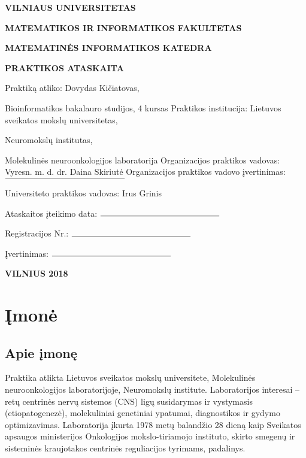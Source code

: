 \documentclass[a4paper,12pt]{article}
\begin{document}
\textwidth 6.5in
\textheight 9.00in
\begin{titlepage}
\vskip 20pt
\centerline{\bf \large VILNIAUS UNIVERSITETAS}
\bigskip
\centerline{\large \textbf{MATEMATIKOS IR INFORMATIKOS FAKULTETAS}}
\bigskip
\centerline{\large \textbf{MATEMATINĖS INFORMATIKOS KATEDRA}}
\vskip 100pt
\centerline{\bf \Large \textbf{PRAKTIKOS ATASKAITA}}
\vskip 100pt
\begin{flushleft}
Praktiką atliko:
\hfill
Dovydas Kičiatovas,

\hfill
Bioinformatikos bakalauro studijos, 4 kursas
\vskip 10pt
Praktikos institucija:
\hfill
Lietuvos sveikatos mokslų universitetas,

\hfill
Neuromokslų institutas,

\hfill
Molekulinės neuroonkologijos laboratorija
\vskip 10pt
Organizacijos praktikos vadovas:
\hfill
Vyresn. m. d. dr. Daina Skiriutė
\vskip 10pt
Organizacijos praktikos vadovo įvertinimas:\hfill$\rule{5cm}{0.15mm}$
\hfill

\vskip 10pt
Universiteto praktikos vadovas:
\hfill
Irus Grinis

\end{flushleft}
\bigskip
\bigskip
\begin{flushright}
Ataskaitos įteikimo data: $\rule{5cm}{0.15mm}$

Registracijos Nr.: $\rule{5cm}{0.15mm}$

Įvertinimas: $\rule{5cm}{0.15mm}$
\end{flushright}
\vskip 100pt
\centerline{\large \textbf{VILNIUS 2018}}
\end{titlepage}
\newpage
\tableofcontents
\newpage
\section{Įmonė}
\indent\indent
\subsection{Apie įmonę}
Praktika atlikta Lietuvos sveikatos mokslų universitete, Molekulinės neuroonkologijos laboratorijoje, Neuromokslų institute. Laboratorijos interesai – retų centrinės nervų sistemos (CNS) ligų susidarymas ir vystymasis (etiopatogenezė), molekuliniai genetiniai ypatumai, diagnostikos ir gydymo optimizavimas. Laboratorija įkurta 1978 metų balandžio 28 dieną kaip Sveikatos apsaugos ministerijos Onkologijos mokslo-tiriamojo instituto, skirto smegenų ir sisteminės kraujotakos centrinės reguliacijos tyrimams, padalinys.
\end{document}
